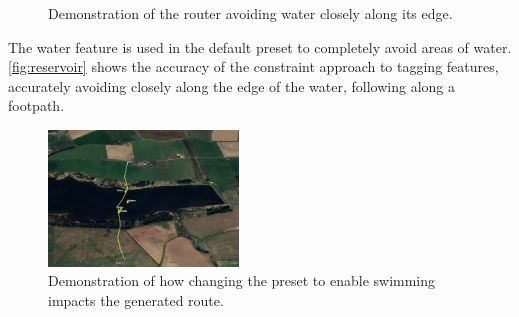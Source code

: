 \documentclass[12pt]{article}
\begin{document}
\begin{figure}[H]
  \centering
  \caption{Demonstration of the router avoiding water closely along its edge.}
  \label{fig:reservoir}
\end{figure}

The water feature is used in the default preset to completely avoid areas of water. \autoref{fig:reservoir} shows the accuracy of the constraint approach to tagging features, accurately avoiding closely along the edge of the water, following along a footpath.

\begin{figure}[H]
  \centering
  \includegraphics[width=0.45\textwidth]{assets/reservoir-swim.png}
  \caption{Demonstration of how changing the preset to enable swimming impacts the generated route.}
  \label{fig:reservoir:swim}
\end{figure}
\end{document}
